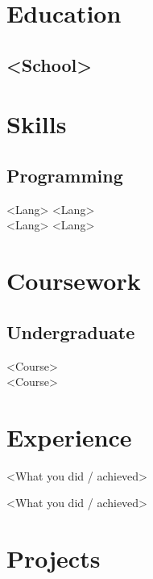\documentclass[]{deedy-resume-openfont}
\begin{document}
\lastupdated


\begin{minipage}[t]{0.33\textwidth}

\section{Education}
\subsection{<School>}
\sectionsep

\section{Skills}
\subsection{Programming}
<Lang> \textbullet{} <Lang> \\
<Lang> \textbullet{} <Lang>
\sectionsep

\section{Coursework}
\subsection{Undergraduate}
<Course> \\
<Course>
\sectionsep

\end{minipage}
\hfill
\begin{minipage}[t]{0.66\textwidth}

\section{Experience}
\vspace{\topsep} %
\begin{tightemize}
\item <What you did / achieved>
\item <What you did / achieved>
\end{tightemize}
\sectionsep

\section{Projects}
\begin{tightemize}
\item <One line about the project>
\end{tightemize}
\sectionsep

\end{minipage}
\end{document}
